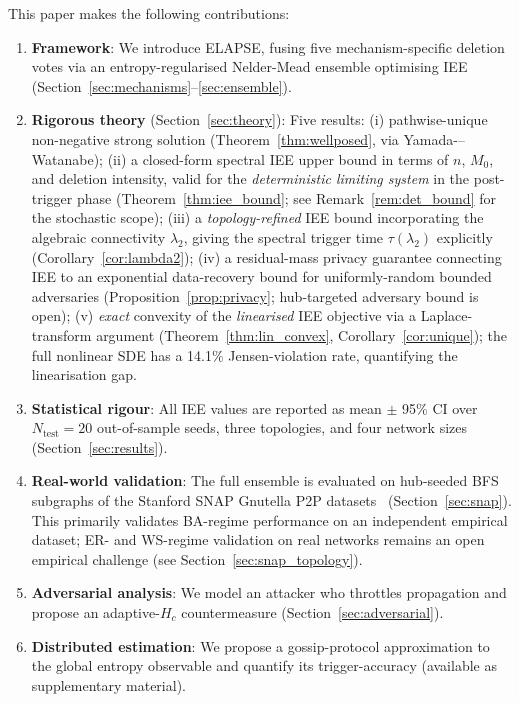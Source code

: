 \documentclass[review,12pt]{elsarticle}
\newcommand{\Hc}{H_c}
\begin{document}
This paper makes the following contributions:
\begin{enumerate}
  \item \textbf{Framework}: We introduce ELAPSE, fusing five mechanism-specific
        deletion votes via an entropy-regularised Nelder-Mead ensemble optimising
        IEE (Section~\ref{sec:mechanisms}--\ref{sec:ensemble}).
  \item \textbf{Rigorous theory} (Section~\ref{sec:theory}):
        Five results: (i) pathwise-unique non-negative strong solution
        (Theorem~\ref{thm:wellposed}, via Yamada-–Watanabe);
        (ii) a closed-form spectral IEE upper bound in terms of $n$, $M_0$,
        and deletion intensity, valid for the \emph{deterministic limiting
        system} in the post-trigger phase (Theorem~\ref{thm:iee_bound};
        see Remark~\ref{rem:det_bound} for the stochastic scope);
        (iii) a \emph{topology-refined} IEE bound incorporating the
        algebraic connectivity $\lambda_2$, giving the spectral trigger
        time $\tau(\lambda_2)$ explicitly (Corollary~\ref{cor:lambda2});
        (iv) a residual-mass privacy guarantee connecting IEE to an
        exponential data-recovery bound for uniformly-random bounded adversaries
        (Proposition~\ref{prop:privacy}; hub-targeted adversary bound is open);
        (v) \emph{exact} convexity of the \emph{linearised} IEE objective
        via a Laplace-transform argument (Theorem~\ref{thm:lin_convex},
        Corollary~\ref{cor:unique}); the full nonlinear SDE has a 14.1\%
        Jensen-violation rate, quantifying the linearisation gap.
  \item \textbf{Statistical rigour}: All IEE values are reported as
        mean $\pm$ 95\% CI over $N_{\mathrm{test}} = 20$ out-of-sample seeds,
        three topologies, and four network sizes (Section~\ref{sec:results}).
  \item \textbf{Real-world validation}: The full ensemble is evaluated on
        hub-seeded BFS subgraphs of the Stanford SNAP Gnutella P2P
        datasets~\cite{snapnets} (Section~\ref{sec:snap}).
        This primarily validates BA-regime performance on an independent
        empirical dataset; ER- and WS-regime validation on real networks
        remains an open empirical challenge (see Section~\ref{sec:snap_topology}).
  \item \textbf{Adversarial analysis}: We model an attacker who throttles
        propagation and propose an adaptive-$\Hc$ countermeasure
        (Section~\ref{sec:adversarial}).
  \item \textbf{Distributed estimation}: We propose a gossip-protocol
        approximation to the global entropy observable and quantify its
        trigger-accuracy (available as supplementary material).
\end{enumerate}
\end{document}
